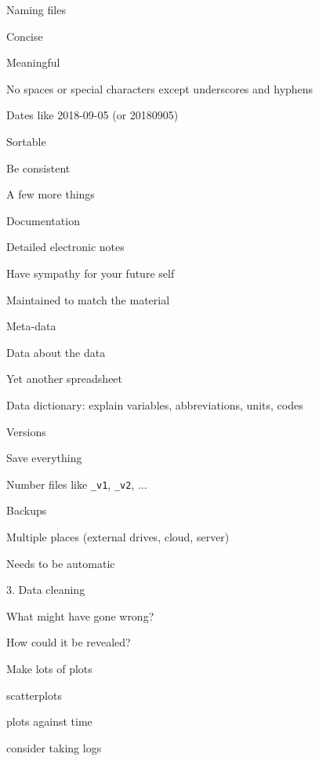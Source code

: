 \documentclass[12pt,t]{beamer}
\begin{document}
\begin{frame}[c]{Naming files}

  \bbi
\item Concise
\item Meaningful
\item No spaces or special characters except underscores and hyphens
\item Dates like 2018-09-05 (or 20180905)
\item Sortable
\item Be consistent
  \ei

\end{frame}



\begin{frame}[c]{A few more things}

  \bbi
\item Documentation
  \bi
\item Detailed electronic notes
\item Have sympathy for your future self
\item Maintained to match the material
  \ei
\item Meta-data
  \bi
\item Data about the data
\item Yet another spreadsheet
\item Data dictionary: explain variables, abbreviations, units, codes
  \ei
\item Versions
  \bi
  \item Save everything
  \item Number files like {\tt \_v1}, {\tt \_v2}, ...
  \ei
\item Backups
  \bi
\item Multiple places (external drives, cloud, server)
\item Needs to be automatic
  \ei
  \ei

\end{frame}




\begin{frame}[c]{3. Data cleaning}

  \bbi
\item What might have gone wrong?
\item How could it be revealed?
\item Make lots of plots
  \bi
\item scatterplots
\item plots against time
\item consider taking logs
  \ei
  \ei

\end{frame}
\end{document}
